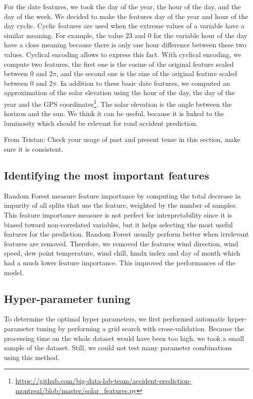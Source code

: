 \documentclass[conference]{IEEEtran}
\newcommand{\TG}[1]{\colorlet{saved}{.}\color{orange}From Tristan: #1\color{saved}}
\begin{document}
For the date features, we took the day of the year, the hour of the day,
and the day of the week. We decided to make the features day of the year
and hour of the day cyclic. Cyclic features are used when the extreme values
of a variable have a similar meaning. For example, the value 23 and 0 for
the variable hour of the day have a close meaning because there is only one
hour difference between these two values. Cyclical encoding allows to express
this fact. With cyclical encoding, we compute two features, the first one is
the cosine of the original feature scaled between 0 and 2$\pi$, and the second
one is the sine of the original feature scaled between 0 and 2$\pi$.
In addition to these basic date features, we computed an approximation
of the solar elevation using the hour of the day, the day of the year
and the GPS coordinates\footnote{\url{https://github.com/big-data-lab-team/accident-prediction-montreal/blob/master/solar\_features.py}}. The solar elevation is the angle 
between the horizon and the sun. We think it can be useful, because it is
linked to the luminosity which should be relevant for road accident prediction.

\TG{Check your usage of past and present tense in this section, make sure it is consistent.}

\subsection{Identifying the most important features}

Random Forest measure feature importance by computing the total
decrease in impurity of all splits that use the feature, weighted by the
number of samples. This feature importance measure is not perfect for
interpretability since it is biased toward non-correlated variables, but it
helps selecting the most useful features for the prediction. 
Random Forest usually perform better when irrelevant features are removed.
Therefore, we removed the features wind direction, wind speed, dew
point temperature, wind chill, hmdx index and day of month which had a
much lower feature importance. This improved the performances of the model.

\subsection{Hyper-parameter tuning}

To determine the optimal hyper parameters, we first performed
automatic hyper-parameter tuning by performing a grid search 
with cross-validation. Because the processing time on the whole dataset would
have been too high, we took a small sample of the dataset. Still, we could
not test many parameter combinations using this method.
\end{document}
